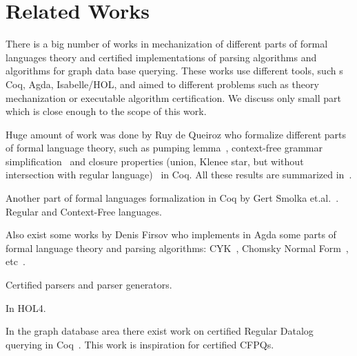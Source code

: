 \section{Related Works}

There is a big number of works in mechanization of different parts of formal languages theory and certified implementations of parsing algorithms and algorithms for graph data base querying.
These works use different tools, such s Coq, Agda, Isabelle/HOL, and aimed to different problems such as theory mechanization or executable algorithm certification.
We discuss only small part which is close enough to the scope of this work.

Huge amount of work was done by Ruy de Queiroz who formalize different parts of formal language theory, such as pumping lemma~\cite{ramos2015formalizationPumping}, context-free grammar simplification~\cite{ramos2015formalization} and closure properties (union, Klenee star, but without intersection with regular language)~\cite{ramos2015formalizationClosure} in Coq.
All these results are summarized in~\cite{ramos2016formalization}. 

Another part of formal languages formalization in Coq by Gert Smolka et.al.~\cite{smolka2017regular, smolka2013regular}.
Regular and Context-Free languages.

Also exist some works by Denis Firsov who implements in Agda some parts of formal language theory and parsing algorithms: CYK~\cite{firsov2014certified}, Chomsky Normal Form~\cite{firsov2015certified}, etc~\cite{firsov2016cfl}.

Certified parsers and parser generators.

In HOL4.

In the graph database area there exist work on certified Regular Datalog querying in Coq~\cite{certifiedPrologGraphQuerying}. 
This work is inspiration for certified CFPQs.


